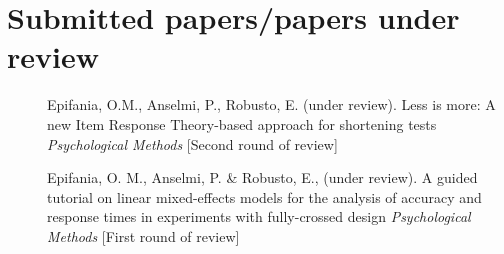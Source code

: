 \documentclass[letterpaper,12pt]{article}
\begin{document}
\section{Submitted papers/papers under review}
\begin{description}
	
	\item[] Epifania, O.M., Anselmi, P., Robusto, E. (under review). Less is more: A new Item Response Theory-based approach for shortening tests \emph{Psychological Methods} [Second round of review]
	\item[] Epifania, O. M., Anselmi, P. \& Robusto, E., (under review).	A guided tutorial on linear mixed-effects models for the analysis of accuracy and response times in experiments with fully-crossed design \emph{Psychological Methods} [First round of review]
	
\end{description}
	
\end{document}
